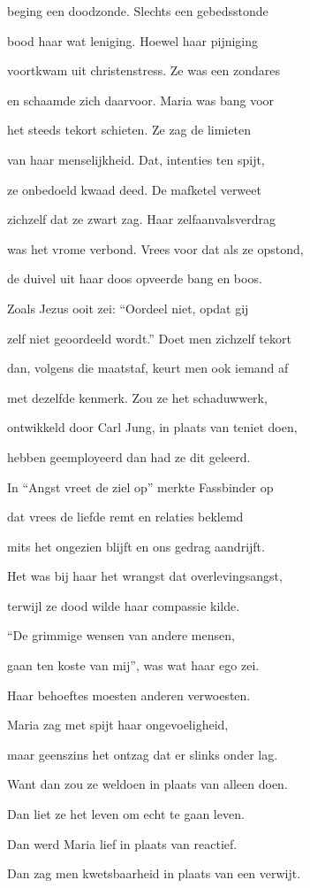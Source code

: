 beging een doodzonde.
Slechts een gebedsstonde

bood haar wat leniging.
Hoewel haar pijniging

voortkwam uit christenstress.
Ze was een zondares

en schaamde zich daarvoor.
Maria was bang voor

het steeds tekort schieten.
Ze zag de limieten

van haar menselijkheid.
Dat, intenties ten spijt,

ze onbedoeld kwaad deed.
De mafketel verweet

zichzelf dat ze zwart zag.
Haar zelfaanvalsverdrag

was het vrome verbond.
Vrees voor dat als ze opstond,

de duivel uit haar doos
opveerde bang en boos.

Zoals Jezus ooit zei:
“Oordeel niet, opdat gij

zelf niet geoordeeld wordt.”
Doet men zichzelf tekort

dan, volgens die maatstaf,
keurt men ook iemand af

met dezelfde kenmerk.
Zou ze het schaduwwerk,

ontwikkeld door Carl Jung,
in plaats van teniet doen,

hebben geemployeerd
dan had ze dit geleerd.

In “Angst vreet de ziel op”
merkte Fassbinder op

dat vrees de liefde remt
en relaties beklemd

mits het ongezien blijft
en ons gedrag aandrijft.

Het was bij haar het wrangst
dat overlevingsangst,

terwijl ze dood wilde
haar compassie kilde.

“De grimmige wensen
van andere mensen,

gaan ten koste van mij”,
was wat haar ego zei.

Haar behoeftes moesten
anderen verwoesten.

Maria zag met spijt
haar ongevoeligheid,

maar geenszins het ontzag
dat er slinks onder lag.

Want dan zou ze weldoen
in plaats van alleen doen.

Dan liet ze het leven
om echt te gaan leven.

Dan werd Maria lief
in plaats van reactief.

Dan zag men kwetsbaarheid
in plaats van een verwijt.


